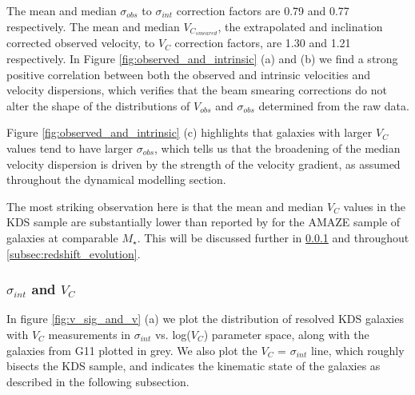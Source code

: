 \documentclass[fleqn,usenatbib]{mn2e}
\begin{document}
The mean and median $\sigma_{obs}$ to $\sigma_{int}$ correction factors are 0.79 and 0.77 respectively. 
The mean and median $V_{C_{smeared}}$, the extrapolated and inclination corrected observed velocity, to $V_{C}$ correction factors, are 1.30 and 1.21 respectively.
In Figure \ref{fig:observed_and_intrinsic} (a) and (b) we find a strong positive correlation between both the observed and intrinsic velocities and velocity dispersions, which verifies that the beam smearing corrections do not alter the shape of the distributions of $V_{obs}$ and $\sigma_{obs}$ determined from the raw data.

Figure \ref{fig:observed_and_intrinsic} (c) highlights that galaxies with larger $V_{C}$ values tend to have larger $\sigma_{obs}$, which tells us that the broadening of the median velocity dispersion is driven by the strength of the velocity gradient, as assumed throughout the dynamical modelling section.

The most striking observation here is that the mean and median $V_{C}$ values in the KDS sample are substantially lower than reported by \cite{Gnerucci2011} for the AMAZE sample of galaxies at comparable $M_{\star}$.
This will be discussed further in \cref{subsubsec:sigma_and_v} and throughout \cref{subsec:redshift_evolution}.

\subsubsection{$\sigma_{int}$ and $V_{C}$}\label{subsubsec:sigma_and_v}
In figure \ref{fig:v_sig_and_v} (a) we plot the distribution of resolved KDS galaxies with $V_{C}$ measurements in $\sigma_{int}$ vs. log($V_{C}$) parameter space, along with the galaxies from G11 plotted in grey.
We also plot the $V_{C}$ = $\sigma_{int}$ line, which roughly bisects the KDS sample, and indicates the kinematic state of the galaxies as described in the following subsection. 
\end{document}
